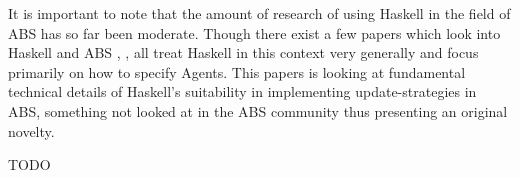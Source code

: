 It is important to note that the amount of research of using Haskell in the field of ABS has so far been moderate. Though there exist a few papers which look into Haskell and ABS \cite{de_jong_suitability_2014}, \cite{sulzmann_specifying_2007}, \cite{jankovic_functional_2007} all treat Haskell in this context very generally and focus primarily on how to specify Agents. This papers is looking at fundamental technical details of Haskell's suitability in implementing update-strategies in ABS, something not looked at in the ABS community thus presenting an original novelty.

TODO \cite{sorokin_aivika_2015}